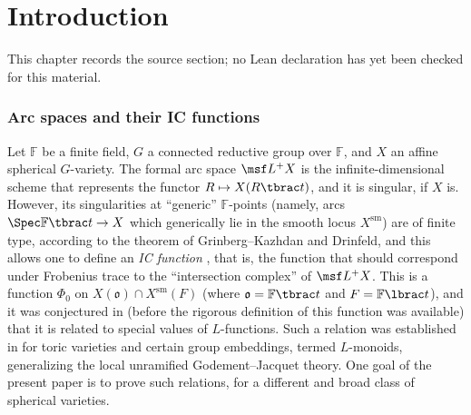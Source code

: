 \chapter{Introduction}
\label{intersection-complexes-unramified-l-factors-chapter-01}

\begin{remark}
\label{intersection-complexes-unramified-l-factors-chapter-01-source}
This chapter records the source section; no Lean declaration has yet been checked for this material.
\notready
\end{remark}

\subsection{Arc spaces and their IC functions}


Let $\mathbb F$ be a finite field, $G$ a connected reductive group over $\mathbb F$, and $X$ an affine spherical $G$-variety. The formal arc space $\msf L^+X$ is the infinite-dimensional scheme that represents the functor $R\mapsto X(R\tbrac t)$, and it is singular, if $X$ is. However, its singularities at ``generic'' $\mathbb F$-points (namely, arcs $\Spec \mathbb F\tbrac t \to X$ which generically lie in the smooth locus $X^{\text{sm}}$) are of finite type, according to the theorem of Grinberg--Kazhdan and Drinfeld, and this allows one to define an \emph{IC function} \cite{BNS}, that is, the function that should correspond under Frobenius trace to the ``intersection complex'' of $\msf L^+X$. This is a function $\Phi_0$ on $X(\mathfrak o)\cap X^{\text{sm}}(F)$ (where $\mathfrak o=\mathbb F\tbrac t$ and $F = \mathbb F\lbrac t$), and it was conjectured in \cite{SaRS} (before the rigorous definition of this function was available) that it is related to special values of $L$-functions. Such a relation was established in \cite{BNS} for toric varieties and certain group embeddings, termed $L$-monoids, generalizing the local unramified Godement--Jacquet theory. One goal of the present paper is to prove such relations, for a different and broad class of spherical varieties.

